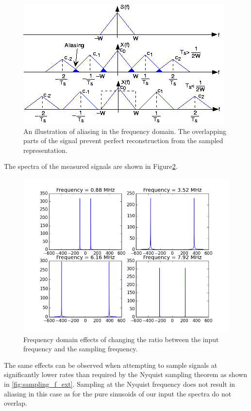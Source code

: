 \documentclass{article}
\begin{document}
\begin{figure}[h!]
\centering
\includegraphics[scale=0.7]{alias_eg.png}
\caption{An illustration of aliasing in the frequency domain. The overlapping parts of the signal prevent perfect reconstruction from the sampled representation.}
\label{fig:aliasing}
\end{figure}

The spectra of the measured signals are shown in Figure\ref{fig:sampling_f}.

\begin{figure}[h!]
\centering
\includegraphics[scale=0.7]{sampling_f.png}
\caption{Frequency domain effects of changing the ratio between the input frequency and the sampling frequency.}
\label{fig:sampling_f}
\end{figure}

The same effects can be observed when attempting to sample signals at significantly lower rates than required by the Nyquist sampling theorem as shown in \ref{fig:sampling_f_ext}. Sampling at the Nyquist frequency does not result in aliasing in this case as for the pure sinusoids of our input the spectra do not overlap.
\end{document}
